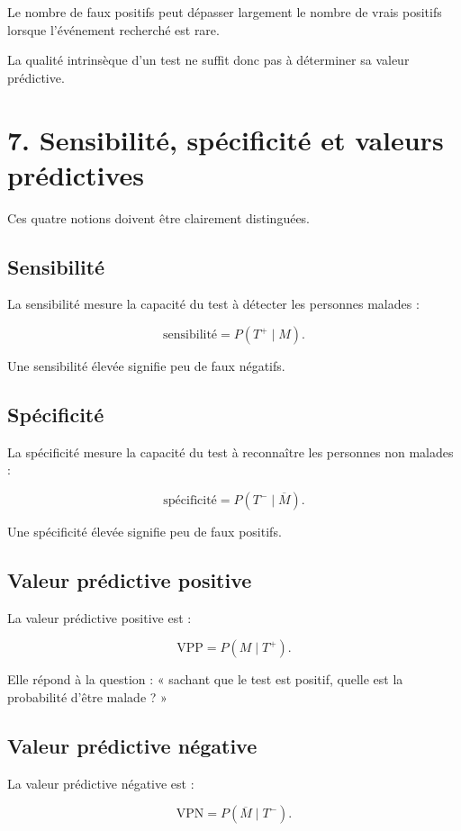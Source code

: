 Le nombre de faux positifs peut dépasser largement le nombre de vrais positifs lorsque l'événement recherché est rare.

La qualité intrinsèque d'un test ne suffit donc pas à déterminer sa valeur prédictive.


\section{7. Sensibilité, spécificité et valeurs prédictives}

Ces quatre notions doivent être clairement distinguées.

\subsection{Sensibilité}

La sensibilité mesure la capacité du test à détecter les personnes malades :

\[
\text{sensibilité}=P(T^+\mid M).
\]

Une sensibilité élevée signifie peu de faux négatifs.

\subsection{Spécificité}

La spécificité mesure la capacité du test à reconnaître les personnes non malades :

\[
\text{spécificité}=P(T^-\mid\overline M).
\]

Une spécificité élevée signifie peu de faux positifs.

\subsection{Valeur prédictive positive}

La valeur prédictive positive est :

\[
\text{VPP}=P(M\mid T^+).
\]

Elle répond à la question : « sachant que le test est positif, quelle est la probabilité d'être malade ? »

\subsection{Valeur prédictive négative}

La valeur prédictive négative est :

\[
\text{VPN}=P(\overline M\mid T^-).
\]


